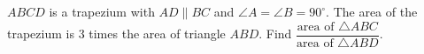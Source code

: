 $ABCD$ is a trapezium with $AD\parallel BC$ and $\angle A=\angle B=90^\circ$. The area of the trapezium is $3$ times the area of triangle $ABD$. Find $\dfrac{\text{area of }\triangle ABC}{\text{area of }\triangle ABD}$.
